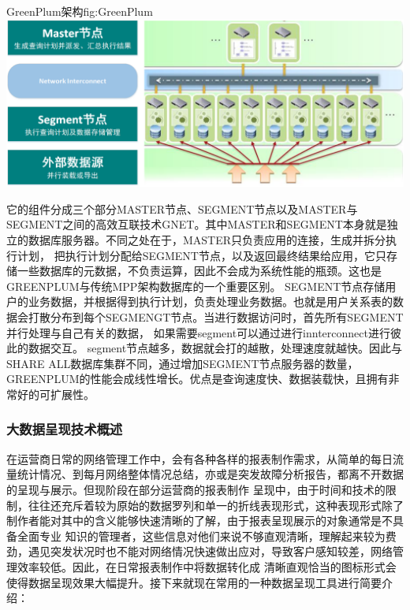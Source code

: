 \documentclass{HustGraduPaper}
\begin{document}
    \begin{generalfig}[htb]{GreenPlum架构}{fig:GreenPlum} 
        \includegraphics[width = \textwidth]{Figures/GreenPlum.png}
    \end{generalfig}

    它的组件分成三个部分MASTER节点、SEGMENT节点以及MASTER与SEGMENT之间的高效互联技术GNET。其中MASTER和SEGMENT本身就是独立的数据库服务器。不同之处在于，MASTER只负责应用的连接，生成并拆分执行计划，
    把执行计划分配给SEGMENT节点，以及返回最终结果给应用，它只存储一些数据库的元数据，不负责运算，因此不会成为系统性能的瓶颈。这也是GREENPLUM与传统MPP架构数据库的一个重要区别。 
    SEGMENT节点存储用户的业务数据，并根据得到执行计划，负责处理业务数据。也就是用户关系表的数据会打散分布到每个SEGMENGT节点。当进行数据访问时，首先所有SEGMENT并行处理与自己有关的数据，
    如果需要segment可以通过进行innterconnect进行彼此的数据交互。 segment节点越多，数据就会打的越散，处理速度就越快。因此与SHARE ALL数据库集群不同，通过增加SEGMENT节点服务器的数量，
    GREENPLUM的性能会成线性增长。优点是查询速度快、数据装载快，且拥有非常好的可扩展性。

    \subsubsection{大数据呈现技术概述}
    在运营商日常的网络管理工作中，会有各种各样的报表制作需求，从简单的每日流量统计情况、到每月网络整体情况总结，亦或是突发故障分析报告，都离不开数据的呈现与展示。但现阶段在部分运营商的报表制作
    呈现中，由于时间和技术的限制，往往还充斥着较为原始的数据罗列和单一的折线表现形式，这种表现形式除了制作者能对其中的含义能够快速清晰的了解，由于报表呈现展示的对象通常是不具备全面专业
    知识的管理者，这些信息对他们来说不够直观清晰，理解起来较为费劲，遇见突发状况时也不能对网络情况快速做出应对，导致客户感知较差，网络管理效率较低。因此，在日常报表制作中将数据转化成
    清晰直观恰当的图标形式会使得数据呈现效果大幅提升。接下来就现在常用的一种数据呈现工具进行简要介绍：
\end{document}
